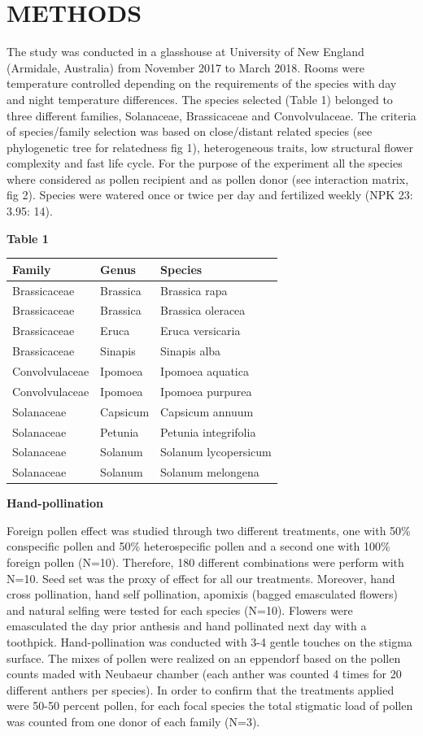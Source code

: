 \documentclass[11pt,a4paper]{article}
\begin{document}
\section{METHODS}\label{methods}

The study was conducted in a glasshouse at University of New England
(Armidale, Australia) from November 2017 to March 2018. Rooms were
temperature controlled depending on the requirements of the species with
day and night temperature differences. The species selected (Table 1)
belonged to three different families, Solanaceae, Brassicaceae and
Convolvulaceae. The criteria of species/family selection was based on
close/distant related species (see phylogenetic tree for relatedness fig
1), heterogeneous traits, low structural flower complexity and fast life
cycle. For the purpose of the experiment all the species where
considered as pollen recipient and as pollen donor (see interaction
matrix, fig 2). Species were watered once or twice per day and
fertilized weekly (NPK 23: 3.95: 14).

\textbf{Table 1}

\begin{longtable}[]{@{}lll@{}}
\toprule
Family & Genus & Species\tabularnewline
\midrule
\endhead
Brassicaceae & Brassica & Brassica rapa\tabularnewline
Brassicaceae & Brassica & Brassica oleracea\tabularnewline
Brassicaceae & Eruca & Eruca versicaria\tabularnewline
Brassicaceae & Sinapis & Sinapis alba\tabularnewline
Convolvulaceae & Ipomoea & Ipomoea aquatica\tabularnewline
Convolvulaceae & Ipomoea & Ipomoea purpurea\tabularnewline
Solanaceae & Capsicum & Capsicum annuum\tabularnewline
Solanaceae & Petunia & Petunia integrifolia\tabularnewline
Solanaceae & Solanum & Solanum lycopersicum\tabularnewline
Solanaceae & Solanum & Solanum melongena\tabularnewline
\bottomrule
\end{longtable}

\textbf{Hand-pollination}

Foreign pollen effect was studied through two different treatments, one
with 50\% conspecific pollen and 50\% heterospecific pollen and a second
one with 100\% foreign pollen (N=10). Therefore, 180 different
combinations were perform with N=10. Seed set was the proxy of effect
for all our treatments. Moreover, hand cross pollination, hand self
pollination, apomixis (bagged emasculated flowers) and natural selfing
were tested for each species (N=10). Flowers were emasculated the day
prior anthesis and hand pollinated next day with a toothpick.
Hand-pollination was conducted with 3-4 gentle touches on the stigma
surface. The mixes of pollen were realized on an eppendorf based on the
pollen counts maded with Neubaeur chamber (each anther was counted 4
times for 20 different anthers per species). In order to confirm that
the treatments applied were 50-50 percent pollen, for each focal species
the total stigmatic load of pollen was counted from one donor of each
family (N=3).
\end{document}
